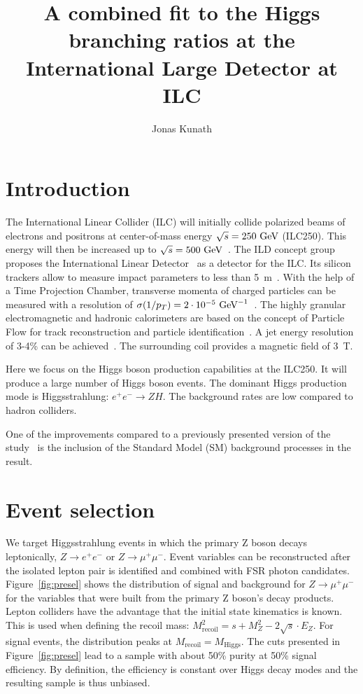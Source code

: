 \documentclass[a4paper,11pt]{article}
\title{A combined fit to the Higgs branching ratios at the International Large Detector at ILC}
\author*[a,\dag]{Jonas Kunath}
\affiliation[a]{Laboratoire Leprince-Ringuet, IN2P3-CNRS, École Polytechnique, Institut Polytechnique de Paris\\
Route de Saclay, 91120 Palaiseau, France}
\newcommand{\eV}{\text{e\kern-0.15ex V}\xspace}
\newcommand{\GeV}{\text{G\eV}\xspace}
\begin{document}
\maketitle

\section{Introduction}
The International Linear Collider (ILC) will initially collide polarized beams
of electrons and positrons at center-of-mass energy $\sqrt{s}=250~\GeV$ (ILC250).
This energy will then be increased up to $\sqrt{s}=500~\GeV$~\cite{ILC_Staging_2017}.
The ILD concept group proposes the International Linear Detector~\cite{ILD_DBD,ILD_IDR}
as a detector for the ILC.
Its silicon trackers allow to measure impact parameters to less than 5~{\textmu}m~\cite{ILD_IDR}.
With the help of a Time Projection Chamber, transverse momenta of charged particles
can be measured with a resolution of $\sigma(1/p_T) = 2 \cdot 10^{-5}~\GeV^{-1}$~\cite{ILD_IDR}.
The highly granular electromagnetic and hadronic calorimeters
are based on the concept of Particle Flow
for track reconstruction and particle identification~\cite{ParticleFlow}.
A jet energy resolution of 3-4\% can be achieved~\cite{ILD_IDR}.
The surrounding coil provides a magnetic field of 3~T.

Here we focus on the Higgs boson production capabilities at the ILC250.
It will produce a large number of Higgs boson events.
The dominant Higgs production mode is Higgsstrahlung: $e^+e^- \to ZH$.
The background rates are low compared to hadron colliders.

One of the improvements compared to
a previously presented version of the study~\cite{LCWS_combined_Higgs}
is the inclusion of the Standard Model (SM) background processes in the result.

\section{Event selection}\label{sec:selection}

We target Higgsstrahlung events in which the primary Z boson decays leptonically,
$Z \to e^+ e^-$ or $Z \to \mu^+ \mu^-$.
Event variables can be reconstructed after the isolated lepton pair is identified
and combined with FSR photon candidates.
Figure~\ref{fig:presel} shows the distribution of signal and background for
$Z \to \mu^+ \mu^-$ for the variables
that were built from the primary Z boson's decay products.
Lepton colliders have the advantage that the initial state kinematics is known.
This is used when defining the recoil mass:
$M_{\mathrm{recoil}}^2 = s + M_Z^2 - 2\sqrt{s} \cdot E_Z$.
For signal events, the distribution peaks at $M_{\mathrm{recoil}} = M_{\mathrm{Higgs}}$.
The cuts presented in Figure~\ref{fig:presel} lead to a sample
with about 50\% purity at 50\% signal efficiency.
By definition, the efficiency is constant over Higgs decay modes
and the resulting sample is thus unbiased.
\end{document}
